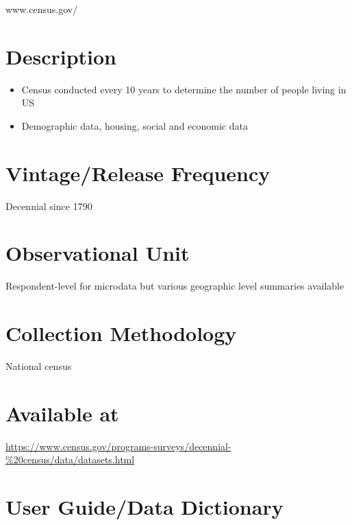 \documentclass[
]{book}
\providecommand{\tightlist}{%
  \setlength{\itemsep}{0pt}\setlength{\parskip}{0pt}}
\begin{document}
www.census.gov/

\hypertarget{description-93}{%
\section{Description}\label{description-93}}

\begin{itemize}
\tightlist
\item
  Census conducted every 10 years to determine the number of people living in US
\item
  Demographic data, housing, social and economic data
\end{itemize}

\hypertarget{vintagerelease-frequency-93}{%
\section{Vintage/Release Frequency}\label{vintagerelease-frequency-93}}

Decennial since 1790

\hypertarget{observational-unit-93}{%
\section{Observational Unit}\label{observational-unit-93}}

Respondent-level for microdata but various geographic level summaries available

\hypertarget{collection-methodology-93}{%
\section{Collection Methodology}\label{collection-methodology-93}}

National census

\hypertarget{available-at-93}{%
\section{Available at}\label{available-at-93}}

\url{https://www.census.gov/programs-surveys/decennial-\%20census/data/datasets.html}

\hypertarget{user-guidedata-dictionary-93}{%
\section{User Guide/Data Dictionary}\label{user-guidedata-dictionary-93}}
\end{document}
